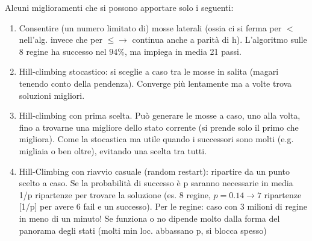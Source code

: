 \hspace{-15pt}Alcuni miglioramenti che si possono apportare solo i seguenti:
\begin{enumerate}
    \item Consentire (un numero limitato di) mosse laterali (ossia ci si ferma per $<$ nell’alg. invece che per $\leq \to$ continua anche a parità di h). L’algoritmo sulle 8 regine ha successo nel $94\%$, ma impiega in media 21 passi.
    \item Hill-climbing stocastico: si sceglie a caso tra le mosse in salita (magari tenendo conto della pendenza). Converge più lentamente ma a volte trova soluzioni migliori.
    \item Hill-climbing con prima scelta. Può generare le mosse a caso, uno alla volta, fino a trovarne una migliore dello stato corrente (si prende solo il primo che migliora). Come la stocastica ma utile quando i successori sono molti (e.g. migliaia o ben oltre), evitando una scelta tra tutti.
    \item Hill-Climbing con riavvio casuale (random restart): ripartire da un punto scelto a caso. Se la probabilità di successo è p saranno necessarie in
    media 1/p ripartenze per trovare la soluzione (es. 8 regine, $p=0.14 \to 7$ ripartenze [1/p] per avere 6 fail e un successo). 
    Per le regine: caso con 3 milioni di regine in meno di un minuto! Se funziona o no dipende molto dalla forma del panorama degli stati (molti min loc. abbassano p, si blocca spesso)
\end{enumerate}

